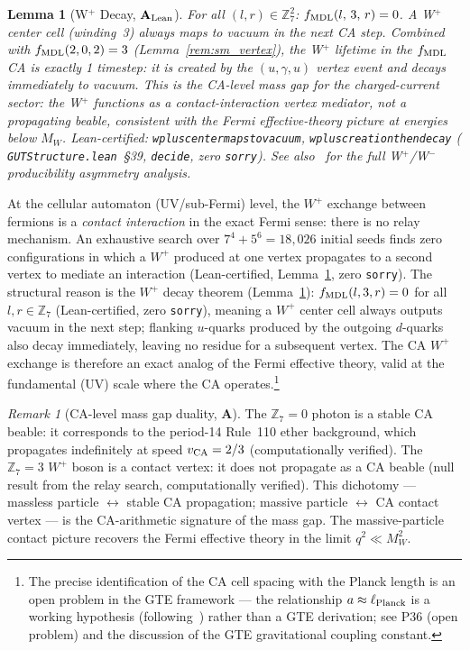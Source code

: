 \documentclass[11pt]{article}
\newtheorem{lemma}[theorem]{Lemma}
\theoremstyle{remark}
\newtheorem{remark}[theorem]{Remark}
\newcommand{\lean}[1]{%
  \penalty-100
  \begingroup\def\_{\textunderscore\allowbreak}\texttt{#1}\endgroup}
\newcommand{\CatA}{\textbf{A}}
\newcommand{\CatAL}{\ensuremath{\textbf{A}_{\rm Lean}}}
\begin{document}
\begin{lemma}[W$^+$ Decay, $\CatAL$]
\label{lem:wplus_decay}
For all $(l, r) \in \mathbb{Z}_7^2$: $f_{\rm MDL}(l,\,3,\,r) = 0$.
A W$^+$ center cell (winding~3) always maps to vacuum in the next CA step.
Combined with $f_{\rm MDL}(2,0,2) = 3$ (Lemma~\ref{rem:sm_vertex}), the W$^+$ lifetime in the $f_{\rm MDL}$ CA is exactly 1 timestep: it is created by the $(u,\gamma,u)$ vertex event and decays immediately to vacuum.
This is the CA-level mass gap for the charged-current sector: the W$^+$ functions as a contact-interaction vertex mediator, not a propagating beable, consistent with the Fermi effective-theory picture at energies below $M_W$.
Lean-certified: \lean{wplus\_center\_maps\_to\_vacuum}, \lean{wplus\_creation\_then\_decay}
(\lean{GUTStructure.lean}~\S39, \lean{decide}, zero \texttt{sorry}).
See also~\cite{SpivackDeeperConsequences} for the full W$^+$/W$^-$ producibility asymmetry analysis.
\end{lemma}

At the cellular automaton (UV/sub-Fermi) level, the $W^+$ exchange between
fermions is a \emph{contact interaction} in the exact Fermi sense: there is no
relay mechanism.
An exhaustive search over $7^4 + 5^6 = 18{,}026$ initial seeds finds zero
configurations in which a $W^+$ produced at one vertex propagates to a second
vertex to mediate an interaction (Lean-certified, Lemma~\ref{lem:wplus_decay}, zero \texttt{sorry}).
The structural reason is the $W^+$ decay theorem (Lemma~\ref{lem:wplus_decay}):
$f_{\rm MDL}(l,3,r) = 0$ for all $l,r \in \mathbb{Z}_7$
(Lean-certified, zero \texttt{sorry}), meaning a $W^+$ center cell always
outputs vacuum in the next step; flanking $u$-quarks produced by the outgoing
$d$-quarks also decay immediately, leaving no residue for a subsequent vertex.
The CA $W^+$ exchange is therefore an exact analog of the Fermi effective theory,
valid at the fundamental (UV) scale where the CA operates.\footnote{\label{fn:planck_working_hypothesis}The precise
identification of the CA cell spacing with the Planck length is an open problem in
the GTE framework --- the relationship $a \approx \ell_{\rm Planck}$ is a working
hypothesis (following~\cite{tHooft2016CA}) rather than a GTE derivation; see P36
(open problem) and the discussion of the GTE gravitational coupling constant.}

\begin{remark}[CA-level mass gap duality, $\CatA$]
\label{rem:mass_gap_duality}
The $\mathbb{Z}_7 = 0$ photon is a stable CA beable: it corresponds to the
period-14 Rule~110 ether background, which propagates indefinitely at speed
$v_{\rm CA} = 2/3$ (computationally verified).
The $\mathbb{Z}_7 = 3$ $W^+$ boson is a contact vertex: it does not propagate
as a CA beable (null result from the relay search, computationally verified).
This dichotomy --- massless particle $\leftrightarrow$ stable CA propagation;
massive particle $\leftrightarrow$ CA contact vertex --- is the CA-arithmetic
signature of the mass gap.
The massive-particle contact picture recovers the Fermi effective theory
in the limit $q^2 \ll M_W^2$.
\end{remark}
\end{document}
